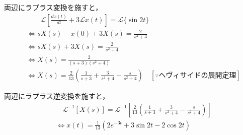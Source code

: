 \documentclass[a4paper,12pt]{article}
\begin{document}
\begin{tcolorbox}[title={[10] つぎの微分方程式をラプラス変換を用いて解け．\\
\[
\frac{dx(t)}{dt} + 3x(t) = sin{2t}
\]

\quad ただし，初期条件は，$x(0)=0$ とする． }]

\quad 両辺にラプラス変換を施すと，
\begin{align*}
    &\qquad \mathcal{L}\left[\frac{dx(t)}{dt} + 3\mathcal{L} x(t)\right] = \mathcal{L}\{\sin 2t\} \\
    &\Leftrightarrow sX(s) - x(0) + 3X(s) = \frac{2}{s^2 + 4} \\
    &\Leftrightarrow sX(s) + 3X(s) = \frac{2}{s^2 + 4} \\
    &\Leftrightarrow X(s) = \frac{2}{(s+3)(s^2 + 4)}  \\
    &\Leftrightarrow X(s)= \frac{2}{13} \left( \frac{1}{s+3} + \frac{3}{s^2 + 4} - \frac{s}{s^2 + 4} \right) 
    \quad \left[ \because ヘヴィサイドの展開定理 \right]
\end{align*}
    
\quad 両辺にラプラス逆変換を施すと，
\vspace{-3mm}
\begin{align*}
&\quad \mathcal{L}^{-1} \left[ X(s) \right] 
= \mathcal{L}^{-1} \left[ \frac{2}{13} \left( \frac{1}{s+3} + \frac{3}{s^2 + 4} - \frac{s}{s^2 + 4} \right) \right] \\
&\Leftrightarrow x(t) = \frac{1}{13} \left( 2e^{-3t} + 3\sin 2t - 2\cos 2t \right)
\end{align*}



\vspace{2mm}
\end{tcolorbox}
\end{document}
